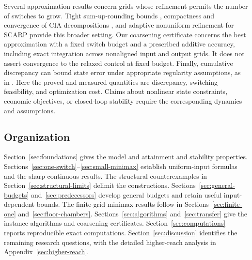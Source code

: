 Several approximation results concern grids whose refinement permits the
number of switches to grow. Tight sum-up-rounding bounds
\cite{kirches2020tight}, compactness and convergence of CIA decompositions
\cite{kirches2021compact}, and adaptive nonuniform refinement for SCARP
\cite{bestehorn2023adaptive} provide this broader setting. Our coarsening
certificate concerns the best approximation with a fixed switch budget and
a prescribed additive accuracy, including exact integration across nonaligned
input and output grids. It does not assert convergence to the relaxed control
at fixed budget. Finally, cumulative discrepancy can bound state error under
appropriate regularity assumptions, as in
\cite[Theorem~1 and Corollary~1]{zeile2022decomposition}. Here the proved and
measured quantities are discrepancy, switching feasibility, and optimization
cost. Claims about nonlinear state constraints, economic objectives, or
closed-loop stability require the corresponding dynamics and assumptions.

\subsection{Organization}

Section~\ref{sec:foundations} gives the model and attainment and stability
properties. Sections~\ref{sec:one-switch}--\ref{sec:small-minimax} establish
uniform-input formulas and the sharp continuous results. The structural
counterexamples in Section~\ref{sec:structural-limits} delimit the constructions.
Sections~\ref{sec:general-budgets} and~\ref{sec:predecessors} develop general
budgets and retain useful input-dependent bounds. The finite-grid minimax
results follow in Sections~\ref{sec:finite-one} and~\ref{sec:floor-chambers}.
Sections~\ref{sec:algorithms} and~\ref{sec:transfer} give the instance algorithms
and coarsening certificates. Section~\ref{sec:computations} reports reproducible
exact computations. Section~\ref{sec:discussion} identifies the remaining
research questions, with the detailed higher-reach analysis in
Appendix~\ref{sec:higher-reach}.
